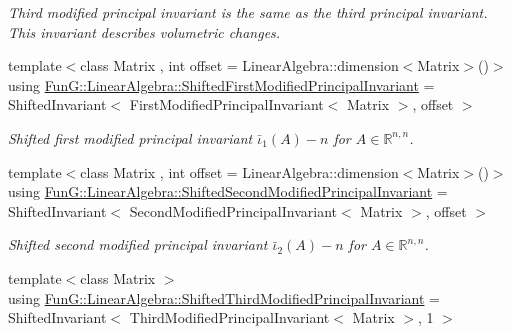 \begin{DoxyCompactItemize}
\begin{DoxyCompactList}\small\item\em Third modified principal invariant is the same as the third principal invariant. This invariant describes volumetric changes. \end{DoxyCompactList}\item 
\hypertarget{group__InvariantGroup_ga9d3d23c4af1debea34a95e4459fd161a}{{\footnotesize template$<$class Matrix , int offset = Linear\-Algebra\-::dimension$<$\-Matrix$>$()$>$ }\\using \hyperlink{group__InvariantGroup_ga9d3d23c4af1debea34a95e4459fd161a}{Fun\-G\-::\-Linear\-Algebra\-::\-Shifted\-First\-Modified\-Principal\-Invariant} = Shifted\-Invariant$<$ First\-Modified\-Principal\-Invariant$<$ Matrix $>$, offset $>$}\label{group__InvariantGroup_ga9d3d23c4af1debea34a95e4459fd161a}

\begin{DoxyCompactList}\small\item\em Shifted first modified principal invariant $ \bar\iota_1(A) - n $ for $ A\in\mathbb{R}^{n,n} $. \end{DoxyCompactList}\item 
\hypertarget{group__InvariantGroup_gaf8a394589529f43798d3f6fe991a737c}{{\footnotesize template$<$class Matrix , int offset = Linear\-Algebra\-::dimension$<$\-Matrix$>$()$>$ }\\using \hyperlink{group__InvariantGroup_gaf8a394589529f43798d3f6fe991a737c}{Fun\-G\-::\-Linear\-Algebra\-::\-Shifted\-Second\-Modified\-Principal\-Invariant} = Shifted\-Invariant$<$ Second\-Modified\-Principal\-Invariant$<$ Matrix $>$, offset $>$}\label{group__InvariantGroup_gaf8a394589529f43798d3f6fe991a737c}

\begin{DoxyCompactList}\small\item\em Shifted second modified principal invariant $ \bar\iota_2(A) - n $ for $ A\in\mathbb{R}^{n,n} $. \end{DoxyCompactList}\item 
\hypertarget{group__InvariantGroup_gac36bff10ee48e8f41ec9b7476a6cbd8c}{{\footnotesize template$<$class Matrix $>$ }\\using \hyperlink{group__InvariantGroup_gac36bff10ee48e8f41ec9b7476a6cbd8c}{Fun\-G\-::\-Linear\-Algebra\-::\-Shifted\-Third\-Modified\-Principal\-Invariant} = Shifted\-Invariant$<$ Third\-Modified\-Principal\-Invariant$<$ Matrix $>$, 1 $>$}\label{group__InvariantGroup_gac36bff10ee48e8f41ec9b7476a6cbd8c}


\end{DoxyCompactItemize}
